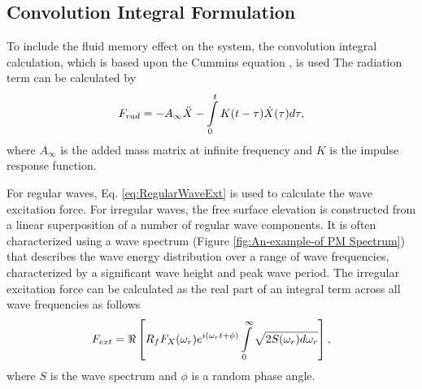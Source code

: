 \subsection{\noindent Convolution Integral Formulation}
\noindent To include the fluid memory effect on the system, the convolution
integral calculation, which is based upon the Cummins equation \cite{Cummins1962}, is used The
radiation term can be calculated by
\begin{equation}
F_{rad}=-A_{\infty}\ddot{X}-\intop_{0}^{t}K(t-\tau)\dot{X}(\tau)d\tau,
\end{equation}
where $A_{\infty}$ is the added mass matrix at infinite frequency and $K$ is the impulse response
function.

\noindent For regular waves, Eq. \ref{eq:RegularWaveExt} is used
to calculate the wave excitation force. For irregular waves, the free
surface elevation is constructed from a linear superposition of a
number of regular wave components. It is often characterized using
a wave spectrum (Figure \ref{fig:An-example-of PM Spectrum}) that
describes the wave energy distribution over a range of wave frequencies,
characterized by a significant wave height and peak wave period. The
irregular excitation force can be calculated as the real part of an
integral term across all wave frequencies as follows
\begin{equation}
F_{ext}=\Re\left[ R_{f} F_{X}(\omega_{r})e^{i(\omega_{r}t+\phi)} \intop_{0}^{\infty}\sqrt{2S(\omega_{r})d\omega_{r}} \right],
\end{equation}
where $S$ is the wave spectrum and $\phi$ is a random phase angle. 

